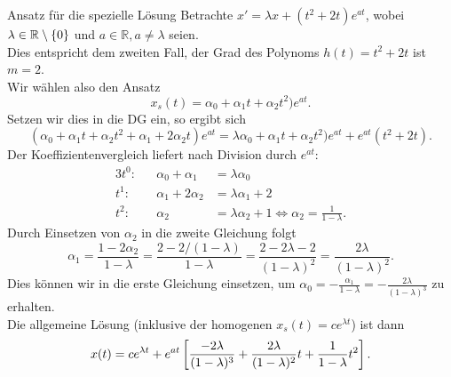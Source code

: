 \begin{Beispiel}
{Ansatz für die spezielle Lösung}
Betrachte $x'=\lambda x+(t^2+2t)e^{at}$, wobei $\lambda\in\mathbb{R}\setminus\left\{0\right\}$ und $a\in\mathbb{R}, a\neq\lambda$ seien.\\
Dies entspricht dem zweiten Fall, der Grad des Polynoms $h(t)=t^2+2t$ ist $m=2$.\\
Wir wählen also den Ansatz
\begin{equation*}
    x_s(t)=\alpha_0+\alpha_1t+\alpha_2t^2)e^{at}.
\end{equation*}
Setzen wir dies in die DG ein, so ergibt sich
\begin{equation*}
    (\alpha_0+\alpha_1t+\alpha_2t^2+\alpha_1+2\alpha_2t)e^{at}=\lambda \alpha_0+\alpha_1t+\alpha_2t^2)e^{at}+e^{at}(t^2+2t).
\end{equation*}
Der Koeffizientenvergleich liefert nach Division durch $e^{at}$:
\begin{alignat*}{3}
t^0:&&\alpha_0+\alpha_1&=\lambda \alpha_0\\
t^1:&&\alpha_1+2\alpha_2&=\lambda \alpha_1+2\\
t^2:&&\alpha_2&=\lambda\alpha_2+1\iff \alpha_2=\frac{1}{1-\lambda}.
\end{alignat*}
Durch Einsetzen von $\alpha_2$ in die zweite Gleichung folgt
\begin{equation*}
    \alpha_1=\frac{1-2\alpha_2}{1-\lambda}=\frac{2-2/(1-\lambda)}{1-\lambda}=\frac{2-2\lambda-2}{(1-\lambda)^2}=\frac{2\lambda}{(1-\lambda)^2}.
\end{equation*}
Dies können wir in die erste Gleichung einsetzen, um $\alpha_0=-\frac{\alpha_1}{1-\lambda}=-\frac{2\lambda}{(1-\lambda)^3}$ zu erhalten.\\
Die allgemeine Lösung (inklusive der homogenen $x_s(t)=ce^{\lambda t}$) ist dann
\begin{equation*}
    x(t)=ce^{\lambda t}+e^{at}\left[{\frac{-2\lambda}{(1-\lambda)^3}+\frac{2\lambda}{(1-\lambda)^2}t+\frac{1}{1-\lambda}t^2}\right].
\end{equation*}
\end{Beispiel}

